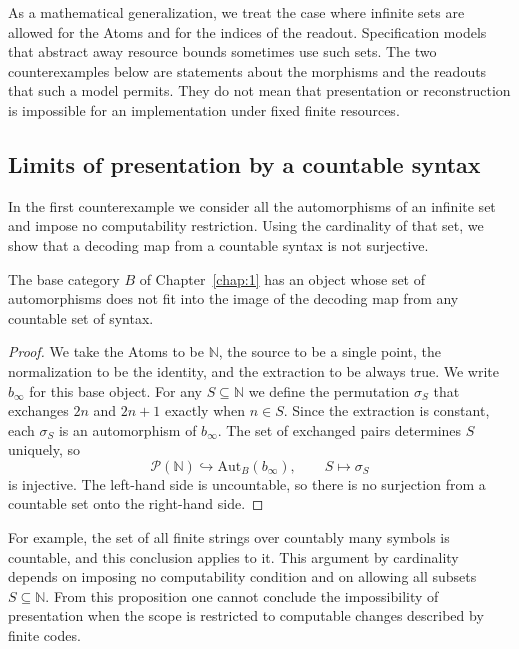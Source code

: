 As a mathematical generalization, we treat the case where infinite sets are allowed for the
Atoms and for the indices of the readout.
Specification models that abstract away resource bounds sometimes use such sets.
The two counterexamples below are statements about the morphisms and the readouts that such a
model permits.
They do not mean that presentation or reconstruction is impossible for an implementation under
fixed finite resources.

\subsection*{Limits of presentation by a countable syntax}

In the first counterexample we consider all the automorphisms of an infinite set and
impose no computability restriction.
Using the cardinality of that set, we show that a decoding map from a countable syntax is not
surjective.

\begin{proposition}\label{prop:8.32}

The base category $B$ of Chapter~\ref{chap:1} has an object whose set of automorphisms does not
fit into the image of the decoding map from any countable set of syntax.

\end{proposition}

\begin{proof}

We take the Atoms to be $\mathbb{N}$, the source to be a single point, the normalization to be
the identity, and the extraction to be always true.
We write $b_\infty$ for this base object.
For any $S\subseteq \mathbb{N}$ we define the permutation $\sigma_S$ that exchanges $2n$ and
$2n+1$ exactly when $n\in S$.
Since the extraction is constant, each $\sigma_S$ is an automorphism of $b_\infty$.
The set of exchanged pairs determines $S$ uniquely, so
\begin{equation*}
\mathcal P(\mathbb{N})\hookrightarrow\mathrm{Aut}_{B}(b_\infty),
\qquad S\longmapsto\sigma_S
\tag{8.32}\label{eq:8.32}
\end{equation*}
is injective. The left-hand side is uncountable, so there is no surjection from a countable set
onto the right-hand side.

\end{proof}

For example, the set of all finite strings over countably many symbols is countable, and this
conclusion applies to it.
This argument by cardinality depends on imposing no computability condition and on allowing all
subsets $S\subseteq \mathbb{N}$.
From this proposition one cannot conclude the impossibility of presentation when the scope is restricted to computable changes described by finite codes.

